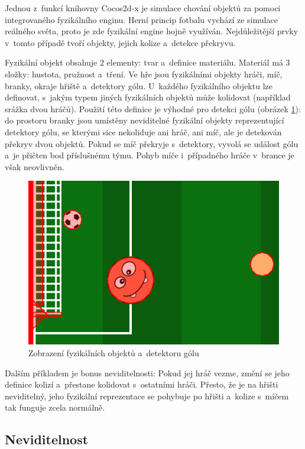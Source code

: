 \documentclass[thesis=B,czech,hidelinks]{FITthesis}[2012/06/26] %
\begin{document}
Jednou z~funkcí knihovny Cocos2d-x je simulace chování objektů za pomoci integrovaného fyzikálního enginu. Herní princip fotbalu vychází ze simulace reálného světa, proto je zde fyzikální engine hojně využíván. Nejdůležitější prvky v~tomto případě tvoří objekty, jejich kolize a~detekce překryvu.

Fyzikální objekt obsahuje 2 elementy: tvar a~definice materiálu. Materiál má 3 složky: hustota, pružnost a~tření. Ve hře jsou fyzikálními objekty hráči, míč, branky, okraje hřiště a~detektory gólu. U~každého fyzikálního objektu lze definovat, s~jakým typem jiných fyzikálních objektů může kolidovat (například srážka dvou hráčů). Použití této definice je výhodné pro detekci gólu (obrázek \ref{picture:goal_detector}): do prostoru branky jsou umístěny neviditelné fyzikální objekty reprezentující detektory gólu, se kterými sice nekoliduje ani hráč, ani míč, ale je detekován překryv dvou objektů. Pokud se míč překryje s~detektory, vyvolá se událost gólu a~je přičten bod příslušnému týmu. Pohyb míče i~případného hráče v~brance je však neovlivněn.

\begin{figure}
\center
\includegraphics{goal_detector}
\caption{Zobrazení fyzikálních objektů a~detektoru gólu}
\label{picture:goal_detector}
\end{figure}

Dalším příkladem je bonus neviditelnosti: Pokud jej hráč vezme, změní se jeho definice kolizí a~přestane kolidovat s~ostatními hráči. Přesto, že je na hřišti neviditelný, jeho fyzikální reprezentace se pohybuje po hřišti a~kolize s~míčem tak funguje zcela normálně.

\subsection{Neviditelnost}
\end{document}
